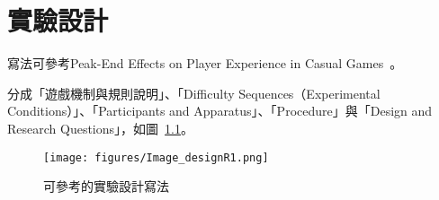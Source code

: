 \renewcommand\thetable{\arabic{chapter}-\arabic{table}}
\chapter{實驗設計}

寫法可參考Peak-End Effects on Player Experience in Casual Games~\cite{PeakEnd2858419}。

	分成「遊戲機制與規則說明」、「Difficulty Sequences（Experimental Conditions）」、「Participants and Apparatus」、「Procedure」與「Design and Research Questions」，如圖~\ref{fig:ImageDesignR1}。

\begin{figure}[h]
  \begin{center}
    \texttt{[image: figures/Image\_designR1.png]}
    \caption{可參考的實驗設計寫法}
    \label{fig:ImageDesignR1}
  \end{center}
\end{figure}

